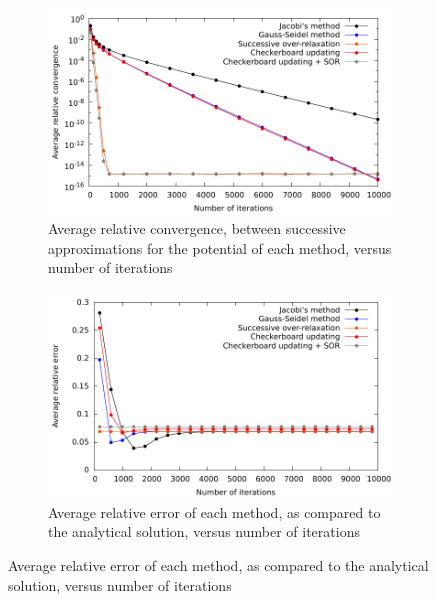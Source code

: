 \documentclass[11pt, a4paper]{article}
\begin{document}
\begin{figure}
\centering 
\begin{subfigure}{0.8\textwidth}
	\includegraphics[scale=0.8]{rel_convergence.pdf}
	\caption{Average relative convergence, between successive approximations for the potential of each method, versus number of iterations}
	\label{fig:conv}
\end{subfigure}

\begin{subfigure}{0.8\textwidth}
	\includegraphics[scale=0.8]{rel_error.pdf}
	\caption{Average relative error of each method, as compared to the analytical solution, versus number of iterations}
	\label{fig:err}
\end{subfigure}


\end{figure}
\end{document}
